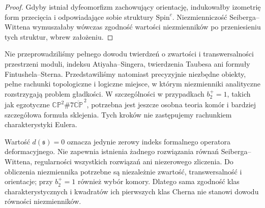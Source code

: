 \begin{proof}
Gdyby istniał dyfeomorfizm zachowujący orientację,
indukowałby izometrię form przecięcia i odpowiadające
sobie struktury $\mathrm{Spin}^c$. Niezmienniczość
Seiberga--Wittena wymuszałaby wówczas zgodność
wartości niezmienników po przeniesieniu tych struktur,
wbrew założeniu.
\end{proof}

\begin{center}
\end{center}

\begin{uwaga}
Nie przeprowadziliśmy pełnego dowodu twierdzeń o zwartości
i transwersalności przestrzeni moduli, indeksu Atiyaha--Singera,
twierdzenia Taubesa ani formuły Fintushela--Sterna.
Przedstawiliśmy natomiast precyzyjnie niezbędne obiekty,
pełne rachunki topologiczne i logiczne miejsce, w którym
niezmienniki analityczne rozstrzygają problem gładkości.
W szczególności w przypadkach $b_2^+=1$, takich jak egzotyczne
$\mathbb{CP}^2\#7\overline{\mathbb{CP}}^{\,2}$, potrzebna
jest jeszcze osobna teoria komór i bardziej szczegółowa
formuła sklejenia. Tych kroków nie zastępujemy
rachunkiem charakterystyki Eulera.
\end{uwaga}


\begin{uwaga}
Wartość $d(\mathfrak s)=0$ oznacza jedynie zerowy indeks
formalnego operatora deformacyjnego. Nie zapewnia istnienia
żadnego rozwiązania równań Seiberga--Wittena, regularności
wszystkich rozwiązań ani niezerowego zliczenia.
Do obliczenia niezmiennika potrzebne są niezależnie
zwartość, transwersalność i orientacje; przy $b_2^+=1$
również wybór komory. Dlatego sama zgodność klas
charakterystycznych i kwadratów ich pierwszych klas
Cherna nie stanowi dowodu równości niezmienników.
\end{uwaga}

